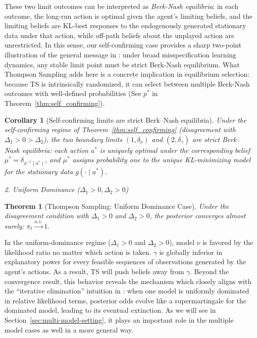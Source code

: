 \documentclass[12pt]{article}
\newtheorem{theorem}{Theorem}
\newtheorem{corollary}{Corollary}
\begin{document}
These two limit outcomes can be interpreted as \emph{Berk-Nash equilibria}: in each outcome, the long-run action is optimal given the agent's limiting beliefs, and the limiting beliefs are KL-best responses to the endogenously generated stationary data under that action, while off-path beliefs about the unplayed action are unrestricted. In this sense, our self-confirming case provides a sharp two-point illustration of the general message in \citet{fudenbergLimitPointsEndogenous2021a}: under broad misspecification learning dynamics, any stable limit point must be strict Berk-Nash equilibrium. What Thompson Sampling adds here is a concrete implication in equilibrium selection: because TS is intrinsically randomized, it can select between multiple Berk-Nash outcomes with well-defined probabilities (See $p^*$ in Theorem~\ref{thm:self_confirming}).

\begin{corollary}[Self-confirming limits are strict Berk--Nash equilibria]
\label{coro:SC_is_BN}
Under the self-confirming regime of Theorem~\ref{thm:self_confirming} (disagreement with $\Delta_1>0>\Delta_2$), the two boundary limits $(1,\delta_\nu)$ and $(2,\delta_\gamma)$ are \emph{strict Berk--Nash equilibria}: each action $a^*$ is uniquely optimal under the corresponding belief $\mu^*=\delta_{\phi^{-1}(a^*)}$, and $\mu^*$ assigns probability one to the unique KL-minimizing model for the stationary data $g(\cdot\mid a^*)$.
\end{corollary}

\vspace{1em}
\noindent\textit{2. Uniform Dominance ($\Delta_1 > 0, \Delta_2 > 0$)}

\begin{theorem}[Thompson Sampling: Uniform Dominance Case]
\label{thm:uniform_dominance}
Under the disagreement condition with $\Delta_1 > 0$ and $\Delta_2 > 0$, the posterior converges almost surely: $\pi_t \xrightarrow{a.s.} 1$.
\end{theorem}

In the uniform-dominance regime ($\Delta_1>0$ and $\Delta_2>0$), model $\nu$ is favored by the likelihood ratio no matter which action is taken. $\gamma$ is globally inferior in explanatory power for every feasible sequences of observations generated by the agent's actions. As a result, TS will push beliefs away from $\gamma$. Beyond the convergence result, this behavior reveals the mechanism which closely aligns with the ``iterative elimination'' intuition in \citet{frickBeliefConvergenceMisspecified2023}: when one model is uniformly dominated in relative likelihood terms, posterior odds evolve like a supermartingale for the dominated model, leading to its eventual extinction. As we will see in Section~\ref{sec:multi-model-setting}, it plays an important role in the multiple model cases as well in a more general way.
\end{document}
